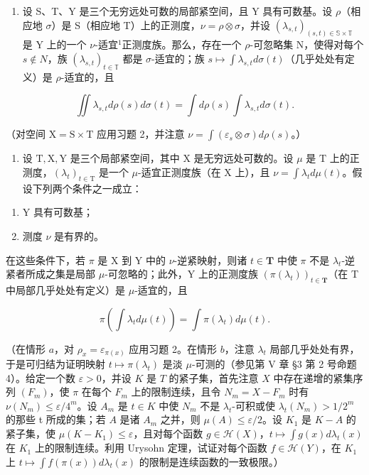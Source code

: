 \begin{enumerate}
\def\labelenumi{\arabic{enumi})}
\setcounter{enumi}{2}
\tightlist
\item
  设 S、T、Y 是三个无穷远处可数的局部紧空间，且 Y 具有可数基。设 \(\rho\)（相应地 \(\sigma\)）是 S（相应地 T）上的正测度，\(\nu = \rho \otimes \sigma\)，并设 \((\lambda_{s,t})_{(s,t) \in \mathbb{S} \times \mathbb{T}}\) 是 Y 上的一个 \(\nu\)-适宜\(^{1}\)正测度族。那么，存在一个 \(\rho\)-可忽略集 N，使得对每个 \(s \notin N\)，族 \((\lambda_{s,t})_{t \in \mathbb{T}}\) 都是 \(\sigma\)-适宜的；族 \(s \mapsto \int \lambda_{s,t} d\sigma(t)\)（几乎处处有定义）是 \(\rho\)-适宜的，且
\end{enumerate}

\[
\iint \lambda_ {s, t} d \rho (s) d \sigma (t) = \int d \rho (s) \int \lambda_ {s, t} d \sigma (t).
\]

（对空间 \(\mathrm{X} = \mathrm{S} \times \mathrm{T}\) 应用习题 2，并注意 \(\nu = \int (\varepsilon_s \otimes \sigma) d\rho(s)\)。）

\begin{enumerate}
\def\labelenumi{\arabic{enumi})}
\setcounter{enumi}{3}
\tightlist
\item
  设 \(\mathrm{T}, \mathrm{X}, \mathrm{Y}\) 是三个局部紧空间，其中 \(\mathrm{X}\) 是无穷远处可数的。设 \(\mu\) 是 \(\mathrm{T}\) 上的正测度，\((\lambda_t)_{t \in \mathrm{T}}\) 是一个 \(\mu\)-适宜正测度族（在 \(\mathrm{X}\) 上），且 \(\nu = \int \lambda_t d\mu(t)\)。假设下列两个条件之一成立：
\end{enumerate}

\begin{enumerate}
\def\labelenumi{\alph{enumi})}
\item
  Y 具有可数基；
\item
  测度 \(\nu\) 是有界的。
\end{enumerate}

在这些条件下，若 \(\pi\) 是 X 到 Y 中的 \(\nu\)-逆紧映射，则诸 \(t \in \mathbf{T}\) 中使 \(\pi\) 不是 \(\lambda_t\)-逆紧者所成之集是局部 \(\mu\)-可忽略的；此外，Y 上的正测度族 \((\pi(\lambda_t))_{t \in \mathbf{T}}\)（在 T 中局部几乎处处有定义）是 \(\mu\)-适宜的，且

\[
\pi \left(\int \lambda_ {t} d \mu (t)\right) = \int \pi (\lambda_ {t}) d \mu (t).
\]

（在情形 \(a\)，对 \(\rho_x = \varepsilon_{\pi(x)}\) 应用习题 2。在情形 \(b\)，注意 \(\lambda_t\) 局部几乎处处有界，于是可归结为证明映射 \(t \mapsto \pi(\lambda_t)\) 是淡 \(\mu\)-可测的（参见第 V 章 §3 第 2 号命题 4）。给定一个数 \(\varepsilon > 0\)，并设 \(K\) 是 \(T\) 的紧子集，首先注意 \(X\) 中存在递增的紧集序列 \((F_m)\)，使 \(\pi\) 在每个 \(F_m\) 上的限制连续，且令 \(N_m = X - F_m\) 时有 \(\nu(N_m) \leqslant \varepsilon/4^m\)。设 \(A_m\) 是 \(t \in K\) 中使 \(N_m\) 不是 \(\lambda_t\)-可积或使 \(\lambda_t(N_m) > 1/2^m\) 的那些 t 所成的集；若 \(A\) 是诸 \(A_m\) 之并，则 \(\mu(A) \leqslant \varepsilon/2\)。设 \(K_1\) 是 \(K - A\) 的紧子集，使 \(\mu(K - K_1) \leqslant \varepsilon\)，且对每个函数 \(g \in \mathcal{H}(X)\)，\(t \mapsto \int g(x) d\lambda_t(x)\) 在 \(K_1\) 上的限制连续。利用 Urysohn 定理，试证对每个函数 \(f \in \mathcal{H}(Y)\)，在 \(K_1\) 上 \(t \mapsto \int f(\pi(x)) d\lambda_t(x)\) 的限制是连续函数的一致极限。）

